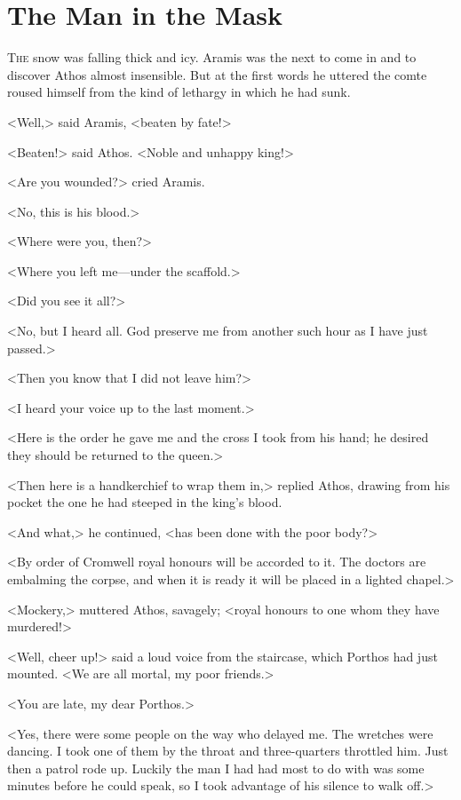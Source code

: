 \chapter{The Man in the Mask}

 \lettrine{T}{he} snow was falling thick and icy. Aramis was the next to come in and to discover Athos almost insensible. But at the first words he uttered the comte roused himself from the kind of lethargy in which he had sunk.

\zz
<Well,> said Aramis, <beaten by fate!>

<Beaten!> said Athos. <Noble and unhappy king!>

<Are you wounded?> cried Aramis.

<No, this is his blood.>

<Where were you, then?>

<Where you left me—under the scaffold.>

<Did you see it all?>

<No, but I heard all. God preserve me from another such hour as I have just passed.>

<Then you know that I did not leave him?>

<I heard your voice up to the last moment.>

<Here is the order he gave me and the cross I took from his hand; he desired they should be returned to the queen.>

<Then here is a handkerchief to wrap them in,> replied Athos, drawing from his pocket the one he had steeped in the king's blood.

<And what,> he continued, <has been done with the poor body?>

<By order of Cromwell royal honours will be accorded to it. The doctors are embalming the corpse, and when it is ready it will be placed in a lighted chapel.>

<Mockery,> muttered Athos, savagely; <royal honours to one whom they have murdered!>

<Well, cheer up!> said a loud voice from the staircase, which Porthos had just mounted. <We are all mortal, my poor friends.>

<You are late, my dear Porthos.>

<Yes, there were some people on the way who delayed me. The wretches were dancing. I took one of them by the throat and three-quarters throttled him. Just then a patrol rode up. Luckily the man I had had most to do with was some minutes before he could speak, so I took advantage of his silence to walk off.>

